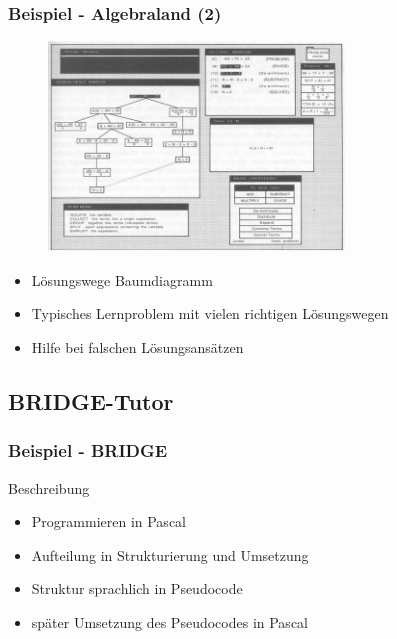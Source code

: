 \documentclass{beamer}
\begin{document}
\begin{frame}
  \frametitle{Beispiel - Algebraland (2)}
  \begin{figure}
    \centering
    \includegraphics[width=0.7\textwidth]{../bilder/algebraland.jpg}
  \end{figure}

  \begin{itemize}
    \item Lösungswege Baumdiagramm
    \item Typisches Lernproblem mit vielen richtigen Lösungswegen
    \item Hilfe bei falschen Lösungsansätzen
  \end{itemize}

\end{frame}

\subsection{BRIDGE-Tutor}
\begin{frame}
  \frametitle{Beispiel - BRIDGE}
  \begin{block}{Beschreibung}
    \begin{itemize}
      \item Programmieren in Pascal
      \item Aufteilung in Strukturierung und Umsetzung
      \item Struktur sprachlich in Pseudocode
      \item später Umsetzung des Pseudocodes in Pascal
    \end{itemize}
  \end{block}
\end{frame}
\end{document}
